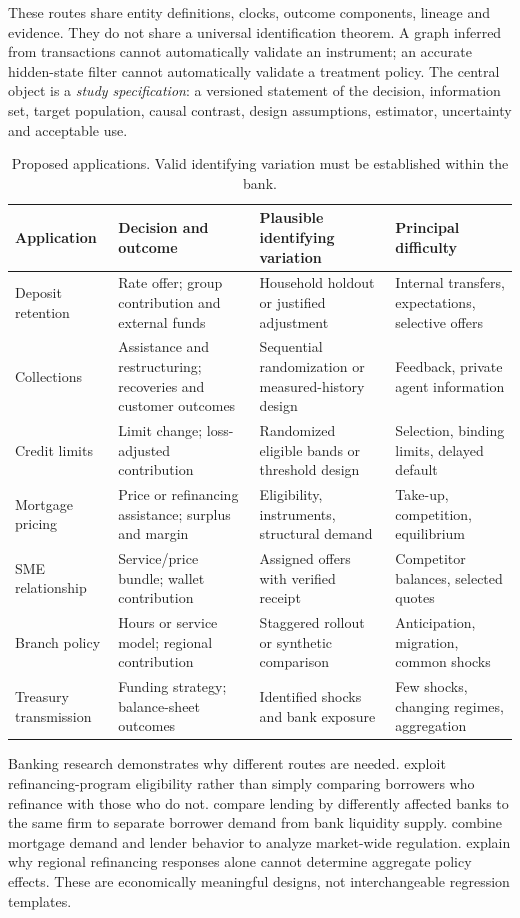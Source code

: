 These routes share entity definitions, clocks, outcome components, lineage and
evidence. They do not share a universal identification theorem. A graph inferred
from transactions cannot automatically validate an instrument; an accurate
hidden-state filter cannot automatically validate a treatment policy.
The central object is a \emph{study specification}: a versioned
statement of the decision, information set, target population, causal contrast,
design assumptions, estimator, uncertainty and acceptable use.

\begin{table}[htbp]\centering\small
\begin{tabularx}{\textwidth}{P{25mm}XXX}
\toprule
Application & Decision and outcome & Plausible identifying variation & Principal difficulty\\
\midrule
Deposit retention & Rate offer; group contribution and external funds & Household holdout or justified adjustment & Internal transfers, expectations, selective offers\\
Collections & Assistance and restructuring; recoveries and customer outcomes & Sequential randomization or measured-history design & Feedback, private agent information\\
Credit limits & Limit change; loss-adjusted contribution & Randomized eligible bands or threshold design & Selection, binding limits, delayed default\\
Mortgage pricing & Price or refinancing assistance; surplus and margin & Eligibility, instruments, structural demand & Take-up, competition, equilibrium\\
SME relationship & Service/price bundle; wallet contribution & Assigned offers with verified receipt & Competitor balances, selected quotes\\
Branch policy & Hours or service model; regional contribution & Staggered rollout or synthetic comparison & Anticipation, migration, common shocks\\
Treasury transmission & Funding strategy; balance-sheet outcomes & Identified shocks and bank exposure & Few shocks, changing regimes, aggregation\\
\bottomrule
\end{tabularx}
\caption{Proposed applications. Valid identifying variation must be established within the bank.}
\label{tab:applications}
\end{table}

Banking research demonstrates why different routes are needed.
\citet{agarwal2020} exploit refinancing-program eligibility rather than simply
comparing borrowers who refinance with those who do not.
\citet{mian2006} compare lending by differently affected banks to the same firm
to separate borrower demand from bank liquidity supply.
\citet{benetton2021} combine mortgage demand and lender behavior to analyze
market-wide regulation. \citet{beraja2019} explain why regional refinancing
responses alone cannot determine aggregate policy effects. These are
economically meaningful designs, not interchangeable regression templates.

